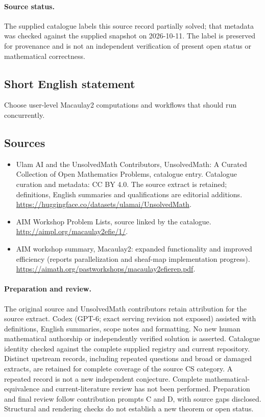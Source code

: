 \documentclass[11pt]{article}
\begin{document}
\paragraph{Source status.}
The supplied catalogue labels this source record partially solved; that metadata was checked against the supplied snapshot on 2026-10-11. The label is preserved for provenance and is not an independent verification of present open status or mathematical correctness.
\subsection{Short English statement}
Choose user-level Macaulay2 computations and workflows that should run concurrently.
\subsection{Sources}
\begin{itemize}
\item[\hypertarget{source:statement:1}{S1}] Ulam AI and the UnsolvedMath Contributors, UnsolvedMath: A Curated Collection of Open Mathematics Problems, catalogue entry. Catalogue curation and metadata: CC BY 4.0. The source extract is retained; definitions, English summaries and qualifications are editorial additions.
\url{https://huggingface.co/datasets/ulamai/UnsolvedMath}.
\item[\hypertarget{source:statement:2}{S2}] AIM Workshop Problem Lists, source linked by the catalogue.
\url{http://aimpl.org/macaulay2efie/1/}.
\item[\hypertarget{source:statement:3}{S3}] AIM workshop summary, Macaulay2: expanded functionality and improved efficiency (reports parallelization and sheaf-map implementation progress).
\url{https://aimath.org/pastworkshops/macaulay2efierep.pdf}.
\end{itemize}
\paragraph{Preparation and review.}
The original source and UnsolvedMath contributors retain attribution for the source extract. Codex (GPT-6; exact serving revision not exposed) assisted with definitions, English summaries, scope notes and formatting. No new human mathematical authorship or independently verified solution is asserted. Catalogue identity checked against the complete supplied registry and current repository. Distinct upstream records, including repeated questions and broad or damaged extracts, are retained for complete coverage of the source CS category. A repeated record is not a new independent conjecture. Complete mathematical-equivalence and current-literature review has not been performed. Preparation and final review follow contribution prompts C and D, with source gaps disclosed. Structural and rendering checks do not establish a new theorem or open status.
\label{end:statement}
\end{document}
